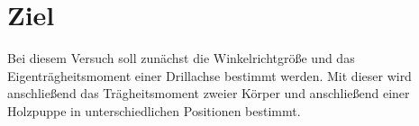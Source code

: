 \section{Ziel}
Bei diesem Versuch soll zunächst die Winkelrichtgröße
und das Eigenträgheitsmoment einer Drillachse
bestimmt werden. Mit dieser wird anschließend das
Trägheitsmoment zweier Körper und anschließend 
einer Holzpuppe in unterschiedlichen Positionen
bestimmt.
